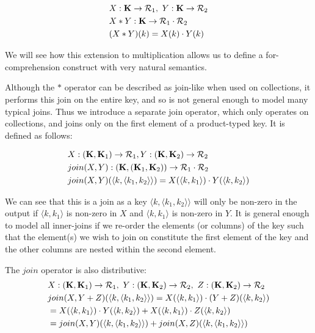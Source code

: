{{{\begin{equation*}
\begin{split}
& X: \mathbf{K} \rightarrow \mathcal{R}_1, \ Y: \mathbf{K} \rightarrow \mathcal{R}_2 \\
& X * Y : \mathbf{K} \rightarrow \mathcal{R}_1 \cdot \mathcal{R}_2 \\
& (X*Y)(k) = X(k) \cdot Y(k)
\end{split}
\end{equation*}

We will see how this extension to multiplication allows us to define a for-comprehension construct with very natural semantics.

Although the $*$ operator can be described as join-like when used on collections, it performs this join on the entire key, and so is not general enough to model many typical joins. Thus we introduce a separate join operator, which only operates on collections, and joins only on the first element of a product-typed key. It is defined as follows:

\begin{equation*}
\begin{split}
& X: (\mathbf{K},\mathbf{K}_1) \rightarrow \mathcal{R}_1,  Y: (\mathbf{K},\mathbf{K}_2) \rightarrow \mathcal{R}_2 \\
& join(X, Y): (\mathbf{K}, (\mathbf{K}_1,\mathbf{K}_2)) \rightarrow \mathcal{R}_1 \cdot \mathcal{R}_2 \\
& join(X, Y)(\langle k, \langle k_1, k_2 \rangle \rangle) = X(\langle k, k_1 \rangle) \cdot Y(\langle k, k_2 \rangle)
\end{split}
\end{equation*}

We can see that this is a join as a key $\langle k, \langle k_1, k_2 \rangle \rangle$ will only be non-zero in the output if $\langle k, k_1 \rangle$ is non-zero in $X$ and $\langle k, k_1 \rangle$ is non-zero in $Y$. It is general enough to model all inner-joins if we re-order the elements (or columns) of the key such that the element(s) we wish to join on constitute the first element of the key and the other columns are nested within the second element. 

The $join$ operator is also distributive:
\begin{equation*}
\begin{split}
&X: (\mathbf{K},\mathbf{K}_1) \rightarrow \mathcal{R}_1,  \ Y: (\mathbf{K},\mathbf{K}_2) \rightarrow \mathcal{R}_2, \ Z: (\mathbf{K},\mathbf{K}_2) \rightarrow \mathcal{R}_2 \\
&join(X,Y+Z)(\langle k, \langle k_1, k_2 \rangle \rangle) = X(\langle k, k_1 \rangle) \cdot (Y+Z)(\langle k, k_2 \rangle) \\
&=X(\langle k, k_1 \rangle) \cdot Y(\langle k, k_2 \rangle) + X(\langle k, k_1 \rangle) \cdot Z(\langle k, k_2 \rangle) \\
&=join(X,Y)(\langle k, \langle k_1, k_2 \rangle \rangle) + join(X,Z)(\langle k, \langle k_1, k_2 \rangle \rangle)
\end{split}
\end{equation*}

}}}
